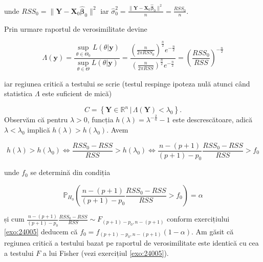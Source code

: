 \documentclass[]{article}
\newcounter{exo}[section]
\renewcommand\refname{Referințe}
\begin{document}
unde
\(RSS_0 = \lVert\boldsymbol Y - \boldsymbol X_0\hat{\boldsymbol\beta}_0\rVert^2\)
iar
\(\hat{\sigma}^2_{0} = \frac{\lVert\boldsymbol Y - \boldsymbol X_0\hat{\boldsymbol\beta}_0\rVert^2}{n} = \frac{RSS_0}{n}\).

Prin urmare raportul de verosimilitate devine

\[
\Lambda(\mathbf{y})=\frac{\sup_{\theta\in\Theta_0}L(\theta|\mathbf{y})}{\sup_{\theta\in\Theta}L(\theta|\mathbf{y})} = \frac{\left(\frac{n}{2\pi RSS_{0}}\right)^{\frac{n}{2}}e^{-\frac{n}{2}}}{\left(\frac{n}{2\pi RSS}\right)^{\frac{n}{2}}e^{-\frac{n}{2}}} = \left(\frac{RSS_0}{RSS}\right)^{-\frac{n}{2}}
\]

iar regiunea critică a testului se scrie (testul respinge ipoteza nulă
atunci când statistica \(\Lambda\) este suficient de mică)

\[
C = \left\{\boldsymbol Y\in\mathbb{R}^n\,|\, \Lambda(\boldsymbol Y)< \lambda_0 \right\}.
\] Observăm că pentru \(\lambda>0\), funcția
\(h(\lambda) = \lambda^{-\frac{2}{n}}-1\) este descrescătoare, adică
\(\lambda<\lambda_0\) implică \(h(\lambda)>h(\lambda_0)\). Avem

\[
h(\lambda)>h(\lambda_0) \iff \frac{RSS_0 - RSS}{RSS}>h(\lambda_0) \iff \frac{n - (p+1)}{(p+1) - p_0}\frac{RSS_0 - RSS}{RSS}>f_0
\]

unde \(f_0\) se determină din condiția

\[
\mathbb{P}_{H_0}\left(\frac{n - (p+1)}{(p+1) - p_0}\frac{RSS_0 - RSS}{RSS}>f_0\right) = \alpha
\]

și cum
\(\frac{n - (p+1)}{(p+1) - p_0}\frac{RSS_0 - RSS}{RSS}\sim F_{(p+1) - p_0, n - (p+1)}\)
conform exercițiului \ref{exo:24005} deducem că
\(f_0 = f_{(p+1) - p_0, n - (p+1)}(1-\alpha)\). Am găsit că regiunea
critică a testului bazat pe raportul de verosimilitate este identică cu
cea a testului \(F\) a lui Fisher (vezi exercițiul \ref{exo:24005}).

\renewcommand\refname{Referințe}

\end{document}
